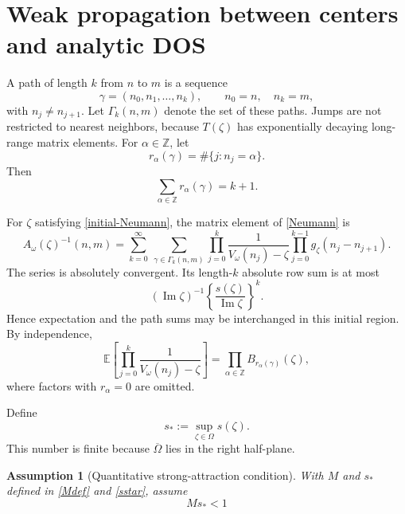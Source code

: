 \documentclass[12pt,a4paper]{article}
\numberwithin{equation}{section}
\newcommand{\E}{\mathbb E}
\newcommand{\Z}{\mathbb Z}
\newcommand{\Om}{\Omega}
\renewcommand{\Im}{\operatorname{Im}}
\newtheorem{ass}[thm]{Assumption}
\begin{document}
\section{Weak propagation between centers and analytic DOS}\label{sec:rwe}

A path of length $k$ from $n$ to $m$ is a sequence
$$
\gamma=(n_0,n_1,\ldots,n_k),
\qquad n_0=n,\quad n_k=m,
$$
with $n_j\ne n_{j+1}$.  Let $\Gamma_k(n,m)$ denote the set of these paths.
Jumps are not restricted to nearest neighbors,
because $T(\zeta)$ has exponentially decaying long-range matrix elements.
For $\alpha\in\Z$, let
$$
r_\alpha(\gamma)
 =\#\{j:n_j=\alpha\}.
$$
Then
\begin{equation}
\sum_{\alpha\in\Z}r_\alpha(\gamma)=k+1.
\label{visit-sum}
\end{equation}

For $\zeta$ satisfying \eqref{initial-Neumann}, the matrix element of
\eqref{Neumann} is
\begin{equation}
A_\omega(\zeta)^{-1}(n,m)
 =\sum_{k=0}^\infty\ \sum_{\gamma\in\Gamma_k(n,m)}
 \prod_{j=0}^k\frac{1}{V_\omega(n_j)-\zeta}
 \prod_{j=0}^{k-1}g_\zeta(n_j-n_{j+1}).
\label{path-expansion}
\end{equation}
The series is absolutely convergent.  Its length-$k$ absolute row sum is at
most
$$
(\Im\zeta)^{-1}
\left\{\frac{s(\zeta)}{\Im\zeta}\right\}^k.
$$
Hence expectation and the path sums may be interchanged in this initial
region.  By independence,
\begin{equation}
\E\left[
\prod_{j=0}^k\frac{1}{V_\omega(n_j)-\zeta}
\right]
 =\prod_{\alpha\in\Z}B_{r_\alpha(\gamma)}(\zeta),
\label{path-average}
\end{equation}
where factors with $r_\alpha=0$ are omitted.

Define
\begin{equation}
s_*:=\sup_{\zeta\in\Om}s(\zeta).
\label{sstar}
\end{equation}
This number is finite because $\overline\Om$ lies in the right half-plane.

\begin{ass}[Quantitative strong-attraction condition]\label{ass:small}
With $M$ and $s_*$ defined in \eqref{Mdef} and \eqref{sstar}, assume
\begin{equation}
Ms_*<1
\label{smallness-1}
\end{equation}
\end{ass}
\end{document}
